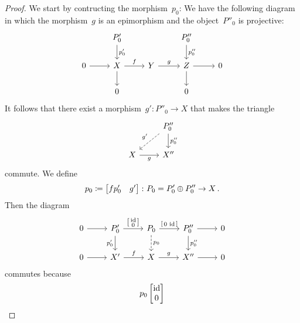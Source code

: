 \begin{proof}
  We start by contructing the morphism~$p_0$:
  We have the following diagram in which the morphism~$g$ is an epimorphism and the object~$P''_0$ is projective:
  \[
    \begin{tikzcd}
        {}
      & P'_0
        \arrow{d}[right]{p'_0}
      & {}
      & P''_0
        \arrow{d}[right]{p''_0}
      & {}
      \\
        0
        \arrow{r}
      & X
        \arrow{r}[above]{f}
        \arrow{d}
      & Y
        \arrow{r}[above]{g}
      & Z 
        \arrow{r}
        \arrow{d}
      & 0
      \\
        {}
      & 0
      & {}
      & 0
      & {}
    \end{tikzcd}
  \]
  It follows that there exist a morphism~$g' \colon P''_0 \to X$ that makes the triangle
  \[
    \begin{tikzcd}
        {}
      & P''_0
        \arrow{d}[right]{p''_0}
        \arrow[dashed]{dl}[above left]{g'}
      \\
        X
        \arrow{r}[below]{g}
      & X''
    \end{tikzcd}
  \]
  commute.
  We define
  \[
    p_0
    \coloneqq
    \begin{bmatrix}
      f p'_0  & g'
    \end{bmatrix}
    \colon
    P_0
    =
    P'_0 \oplus P''_0
    \to
    X \,.
  \]
  Then the diagram
  \[
    \begin{tikzcd}[ampersand replacement = \&]
          0
          \arrow{r}
      \&  P'_0
          \arrow{r}[above]{\begin{bsmallmatrix} \id \\ 0 \end{bsmallmatrix}}
          \arrow{d}[left]{p'_0}
      \&  P_0
          \arrow{r}[above]{\begin{bsmallmatrix} 0 & \id \end{bsmallmatrix}}
          \arrow[dashed]{d}[right]{p_0}
      \&  P''_0
          \arrow{r}
          \arrow{d}[right]{p''_0}
      \&  0
      \\
          0
          \arrow{r}
      \&  X'
          \arrow{r}[above]{f}
      \&  X
          \arrow{r}[above]{g}
      \&  X''
          \arrow{r}
      \&  0
    \end{tikzcd}
  \]
  commutes because
  \begin{gather*}
      p_0
      \begin{bmatrix}
        \id \\
        0
      \end{bmatrix}

\end{gather*}
\end{proof}
